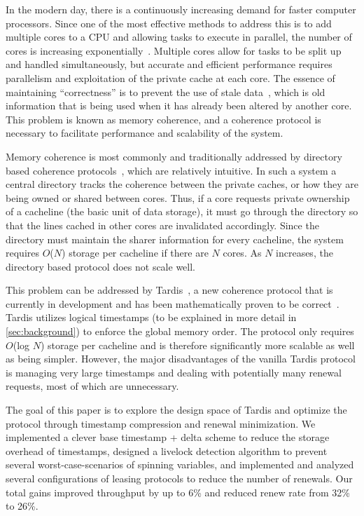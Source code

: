 \documentclass[12pt]{article}
\begin{document}
In the modern day, there is a continuously increasing demand for 
faster computer processors. Since one of the most effective methods to 
address this is to add multiple cores to a CPU and allowing tasks to 
execute in parallel, the number of cores is increasing 
exponentially~\cite{tilera, xeonphi}. 
% 
Multiple cores allow for tasks to be split up and handled 
simultaneously, but accurate and efficient performance requires 
parallelism and exploitation of the private cache at each core.  The 
essence of maintaining ``correctness'' is to prevent the use of stale 
data~\cite{lamport1978}, which is old information that is being used 
when it has already been altered by another core. This problem is 
known as memory coherence, and a coherence protocol is necessary to 
facilitate performance and scalability of the system.

Memory coherence is most commonly and traditionally addressed by 
directory based coherence protocols~\cite{censier1978, tang1976}, 
which are relatively intuitive. In such a system a central directory
tracks the coherence between the private caches, or how they are being
owned or shared between cores. Thus, if a core requests private
ownership of a cacheline (the basic unit of data storage), it must
go through the directory so that the lines cached in other cores are 
invalidated accordingly. Since the directory must maintain the sharer 
information for every cacheline, the system requires $O$($N$) storage per 
cacheline if there are $N$ cores.  As $N$ increases, the directory based 
protocol does not scale well.

This problem can be addressed by Tardis~\cite{tardis}, a new coherence 
protocol that is currently in development and has been mathematically 
proven to be correct~\cite{tardis-proof}. Tardis utilizes logical 
timestamps (to be explained in more detail in \cref{sec:background}) to enforce 
the global memory order. The protocol only requires $O$(log $N$) storage 
per cacheline and is therefore significantly more scalable as well as 
being simpler. However, the major disadvantages of the vanilla Tardis 
protocol is managing very large timestamps and dealing with 
potentially many renewal requests, most of which are unnecessary. 

The goal of this paper is to explore the design space of Tardis and 
optimize the protocol through timestamp compression and renewal 
minimization. We implemented a clever base timestamp + delta scheme to 
reduce the storage overhead of timestamps, designed a livelock 
detection algorithm to prevent several worst-case-scenarios of 
spinning variables, and implemented and analyzed several 
configurations of leasing protocols to reduce the number of renewals. Our total gains improved throughput by up to 6\% and reduced renew rate from 32\% to 26\%.
\end{document}
